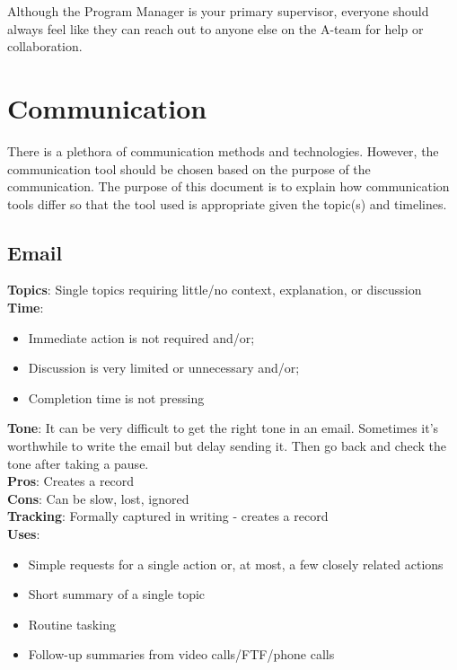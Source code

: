 \documentclass[
  letterpaper,
  DIV=11,
  numbers=noendperiod]{scrreprt}
\providecommand{\tightlist}{%
  \setlength{\itemsep}{0pt}\setlength{\parskip}{0pt}}\usepackage{longtable,booktabs,array}
\begin{document}
Although the Program Manager is your primary supervisor, everyone should
always feel like they can reach out to anyone else on the A-team for
help or collaboration.


\hypertarget{communication}{%
\chapter{Communication}\label{communication}}

There is a plethora of communication methods and technologies. However,
the communication tool should be chosen based on the purpose of the
communication. The purpose of this document is to explain how
communication tools differ so that the tool used is appropriate given
the topic(s) and timelines.

\hypertarget{email}{%
\section{Email}\label{email}}

\textbf{Topics}: Single topics requiring little/no context, explanation,
or discussion\\
\textbf{Time}:

\begin{itemize}
\tightlist
\item
  Immediate action is not required and/or;\\
\item
  Discussion is very limited or unnecessary and/or;\\
\item
  Completion time is not pressing
\end{itemize}

\textbf{Tone}: It can be very difficult to get the right tone in an
email. Sometimes it's worthwhile to write the email but delay sending
it. Then go back and check the tone after taking a pause.\\
\textbf{Pros}: Creates a record\\
\textbf{Cons}: Can be slow, lost, ignored\\
\textbf{Tracking}: Formally captured in writing - creates a record\\
\textbf{Uses}:

\begin{itemize}
\tightlist
\item
  Simple requests for a single action or, at most, a few closely related
  actions\\
\item
  Short summary of a single topic\\
\item
  Routine tasking\\
\item
  Follow-up summaries from video calls/FTF/phone calls
\end{itemize}
\end{document}
